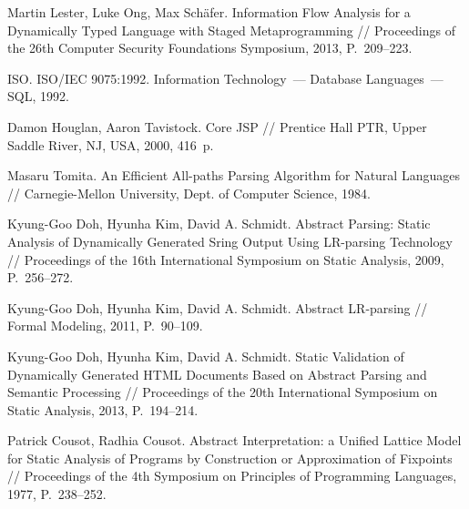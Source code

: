 \documentclass{llncs}
\begin{document}
\begin{thebibliography}{}
Martin Lester, Luke Ong, Max Sch{\"{a}}fer.
Information Flow Analysis for a Dynamically Typed Language with Staged Metaprogramming //
Proceedings of the 26th Computer Security Foundations Symposium, 2013, P.~209--223.

ISO. ISO/IEC 9075:1992. Information Technology~--- Database Languages~--- SQL, 1992.

Damon Houglan, Aaron Tavistock. Core JSP // Prentice Hall PTR, Upper Saddle River, NJ, USA, 2000, 416~p.

Masaru Tomita.
An Efficient All-paths Parsing Algorithm for Natural Languages //
Carnegie-Mellon University, Dept. of Computer Science, 1984.

Kyung-Goo Doh, Hyunha Kim, David A. Schmidt. Abstract Parsing: Static Analysis of 
Dynamically Generated Sring Output Using LR-parsing Technology // 
Proceedings of the 16th International Symposium on Static Analysis, 2009, P.~256--272.

Kyung-Goo Doh, Hyunha Kim, David A. Schmidt. Abstract LR-parsing // Formal Modeling, 2011, P.~90--109.

Kyung-Goo Doh, Hyunha Kim, David A. Schmidt. Static Validation of Dynamically Generated HTML 
Documents Based on Abstract Parsing and Semantic Processing // 
Proceedings of the 20th International Symposium on Static Analysis, 2013, P.~194--214.

Patrick Cousot, Radhia Cousot. Abstract Interpretation: a Unified Lattice Model for Static Analysis 
of Programs by Construction or Approximation of Fixpoints // Proceedings of the 4th Symposium on Principles of Programming Languages, 1977, P.~238--252.

\end{thebibliography}


\end{document}
